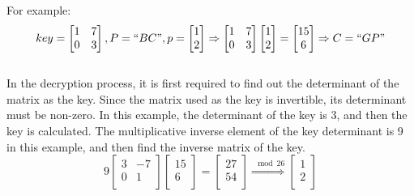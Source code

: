 \documentclass{article}
\begin{document}
For example:\\

\begin{equation}
key=
\left[
\begin{matrix}
1 & 7 \\
0 & 3 
\end{matrix}
\right]
,P=``BC",p=
\left[
\begin{matrix}
1 \\
2 \\
\end{matrix}
\right]
\Rightarrow
\left[
\begin{matrix}
1 & 7 \\
0 & 3 
\end{matrix}
\right]
\left[
\begin{matrix}
1 \\
2 \\
\end{matrix}
\right]
=
\left[
\begin{matrix}
15 \\
6 \\
\end{matrix}
\right]
\Rightarrow
C=``GP"
\end{equation}\\

In the decryption process, it is first required to find out the determinant of the matrix as the key. Since the matrix used as the key is invertible, its determinant must be non-zero. In this example, the determinant of the key is 3, and then the key is calculated. The multiplicative inverse element of the key determinant is 9 in this example, and then find the inverse matrix of the key.\\

\begin{equation}
9
\left[
\begin{matrix}
3 & -7 \\
0 & 1 \\
\end{matrix}
\right]
\left[
\begin{matrix}
15 \\
6 \\
\end{matrix}
\right]
=
\left[
\begin{matrix}
27 \\
54 \\
\end{matrix}
\right]
\stackrel{\mod 26}{\Longrightarrow}
\left[
\begin{matrix}
1 \\
2 \\
\end{matrix}
\right]
\end{equation}\\
\end{document}
